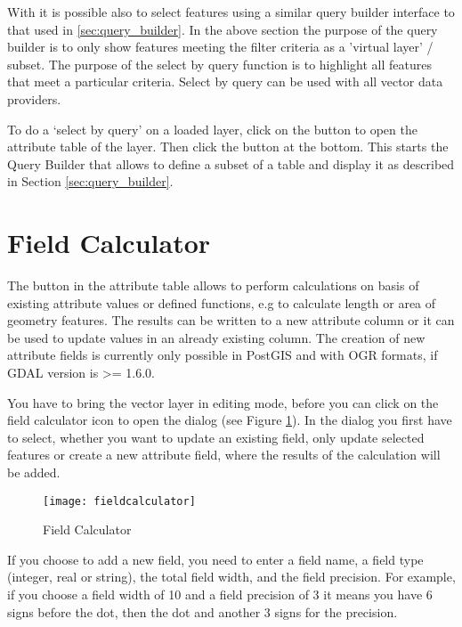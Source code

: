 With \qg it is possible also to select features using a similar query builder
interface to that used in \ref{sec:query_builder}. In the above section
the purpose of the query builder is to only show features meeting the
filter criteria as a 'virtual layer' / subset. The purpose of the select by
query function is to highlight all features that meet a particular criteria.
Select by query can be used with all vector data providers.

To do a `select by query' on a loaded layer, click on the
button  to open the attribute table of the layer. Then
click the  button at the bottom. This starts the Query Builder
that allows to define a subset of a table and display it as described in Section
\ref{sec:query_builder}.

\section{Field Calculator}\label{sec:field_calculator}

The  button in the
attribute table allows to perform calculations on basis of existing
attribute values or defined functions, e.g to calculate length or area
of geometry features. The results can be written to a new attribute column
or it can be used to update values in an already existing column. The creation
of new attribute fields is currently only possible in PostGIS and with OGR
formats, if GDAL version is >= 1.6.0.

You have to bring the vector layer in editing mode, before you can click on
the field calculator icon to open the dialog (see Figure
\ref{fig:field_calculator}). In the dialog you first have to select, whether
you want to update an existing field, only update selected features or
create a new attribute field, where the results of the calculation will be added.

\begin{figure}[ht]
  \centering
    \texttt{[image: fieldcalculator]}
    \caption{Field Calculator \nixcaption}\label{fig:field_calculator}
\end{figure}

If you choose to add a new field, you need to enter a field name, a field type
(integer, real or string), the total field width, and the field precision.
For example, if you choose a field width of 10 and a field precision of 3 it
means you have 6 signs before the dot, then the dot and another 3 signs for the
precision.

